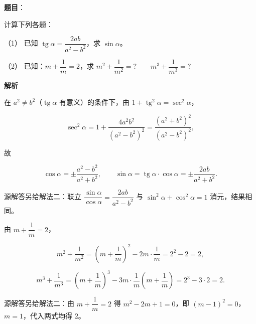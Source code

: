 \begin{answer}

\textbf{题目}：

计算下列各题：

（1） 已知 $\operatorname{tg}\alpha=\dfrac{2ab}{a^{2}-b^{2}}$，求 $\sin\alpha$。

（2） 已知：$m+\dfrac{1}{m}=2$，求 $m^{2}+\dfrac{1}{m^{2}}=?\qquad m^{3}+\dfrac{1}{m^{3}}=?$

\textbf{解析}


在 $a^{2}\neq b^{2}$（$\operatorname{tg}\alpha$ 有意义）的条件下，由 $1+\operatorname{tg}^{2}\alpha=\sec^{2}\alpha$，

\nopagebreak[4]
\[
\sec^{2}\alpha=1+\frac{4a^{2}b^{2}}{(a^{2}-b^{2})^{2}}
=\frac{(a^{2}+b^{2})^{2}}{(a^{2}-b^{2})^{2}},
\]

故

\nopagebreak[4]
\[
\cos\alpha=\pm\frac{a^{2}-b^{2}}{a^{2}+b^{2}},
\qquad
\sin\alpha=\operatorname{tg}\alpha\cdot\cos\alpha
=\pm\frac{2ab}{a^{2}+b^{2}}.
\]

源解答另给解法二：联立 $\dfrac{\sin\alpha}{\cos\alpha}=\dfrac{2ab}{a^{2}-b^{2}}$ 与 $\sin^{2}\alpha+\cos^{2}\alpha=1$ 消元，结果相同。


由 $m+\dfrac{1}{m}=2$，

\nopagebreak[4]
\[
m^{2}+\frac{1}{m^{2}}
=\left(m+\frac{1}{m}\right)^{2}-2m\cdot\frac{1}{m}
=2^{2}-2=2,
\]

\nopagebreak[4]
\[
m^{3}+\frac{1}{m^{3}}
=\left(m+\frac{1}{m}\right)^{3}-3m\cdot\frac{1}{m}\left(m+\frac{1}{m}\right)
=2^{3}-3\cdot2=2.
\]

源解答另给解法二：由 $m+\dfrac{1}{m}=2$ 得 $m^{2}-2m+1=0$，即 $(m-1)^{2}=0$，$m=1$，代入两式均得 $2$。



\end{answer}

